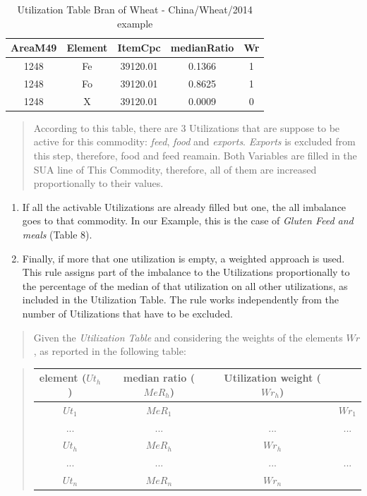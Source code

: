 \documentclass[]{article}
\begin{document}
\begin{table}

\caption{\label{tab:t9}Utilization Table Bran of Wheat - China/Wheat/2014 example}
\centering
\begin{tabular}[t]{c|c|c|c|c}
\hline
AreaM49 & Element & ItemCpc & medianRatio & Wr\\
\hline
1248 & Fe & 39120.01 & 0.1366 & 1\\
\hline
1248 & Fo & 39120.01 & 0.8625 & 1\\
\hline
1248 & X & 39120.01 & 0.0009 & 0\\
\hline
\end{tabular}
\end{table}

\begin{quote}
According to this table, there are 3 Utilizations that are suppose to be
active for this commodity: \emph{feed}, \emph{food} and \emph{exports}.
\emph{Exports} is excluded from this step, therefore, food and feed
reamain. Both Variables are filled in the SUA line of This Commodity,
therefore, all of them are increased proportionally to their values.
\end{quote}

\begin{enumerate}
\def\labelenumi{\arabic{enumi}.}
\setcounter{enumi}{1}
\item
  If all the activable Utilizations are already filled but one, the all
  imbalance goes to that commodity. In our Example, this is the case of
  \emph{Gluten Feed and meals} (Table 8).
\item
  Finally, if more that one utilization is empty, a weighted approach is
  used. This rule assigns part of the imbalance to the Utilizations
  proportionally to the percentage of the median of that utilization on
  all other utilizations, as included in the Utilization Table. The rule
  works independently from the number of Utilizations that have to be
  excluded.
\end{enumerate}

\begin{quote}
Given the \emph{Utilization Table} and considering the weights of the
elements \emph{\(Wr\)}, as reported in the following table:
\end{quote}

\begin{quote}
\begin{center}
\begin{tabular}{ c|c|c|c } 
\hline
element ($Ut_{h}$) & median ratio ($MeR_{h}$) & Utilization weight ($Wr_{h}$)\\
\hline
$Ut_{1}$ & $MeR_{1}$ &  & $Wr_{1}$\\ 
... & ... & ... & ...\\ 
$Ut_{h}$ & $MeR_{h}$ & $Wr_{h}$\\ 
... & ... & ... & ...\\ 
$Ut_{n}$ & $MeR_{n}$ & $Wr_{n}$\\ 
\hline
\end{tabular}
\end{center}
\end{quote}
\end{document}
